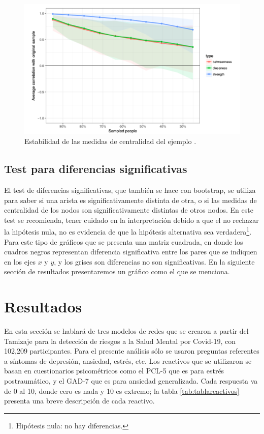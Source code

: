 \documentclass[11pt,spanish]{article}\usepackage[]{graphicx}\usepackage[]{color}
\begin{document}
\begin{figure}[!ht]
\centering
\includegraphics[scale=0.5]{images/estabilidad_tutorial}
\caption{Estabilidad de las medidas de centralidad del ejemplo \cite{main_tutorial}.}
\label{fig:estabilidad_tutorial}
\end{figure}

\subsection{Test para diferencias significativas}

El test de diferencias significativas, que también se hace con bootstrap, se utiliza para saber si una arista es significativamente distinta de otra, o si las medidas de centralidad de los nodos son significativamente distintas de otros nodos. En este test se recomienda, tener cuidado en la interpretación debido a que el no rechazar la hipótesis nula, no es evidencia de que la hipótesis alternativa sea verdadera\footnote{Hipótesis nula: no hay diferencias.}. Para este tipo de gráficos que se presenta una matriz cuadrada, en donde los cuadros negros representan diferencia significativa entre los pares que se indiquen en los ejes $x$ y $y$, y los grises son diferencias no son significativas. En la siguiente sección de resultados presentaremos un gráfico como el que se menciona. 

\newpage

\section{Resultados}

En esta sección se hablará de tres modelos de redes que se crearon a partir del Tamizaje para la detección de riesgos a la Salud Mental por Covid-19, con 102,209 participantes. Para el presente análisis sólo se usaron preguntas referentes a síntomas de depresión, ansiedad, estrés, etc. Los reactivos que se utilizaron se basan en cuestionarios psicométricos como el PCL-5 que es para estrés postraumático, y el GAD-7 que es para ansiedad generalizada. Cada respuesta va de 0 al 10, donde cero es nada y 10 es extremo; la tabla \ref{tab:tablareactivos} presenta una breve descripción de cada reactivo. 
\vspace{0.5cm}
\end{document}

